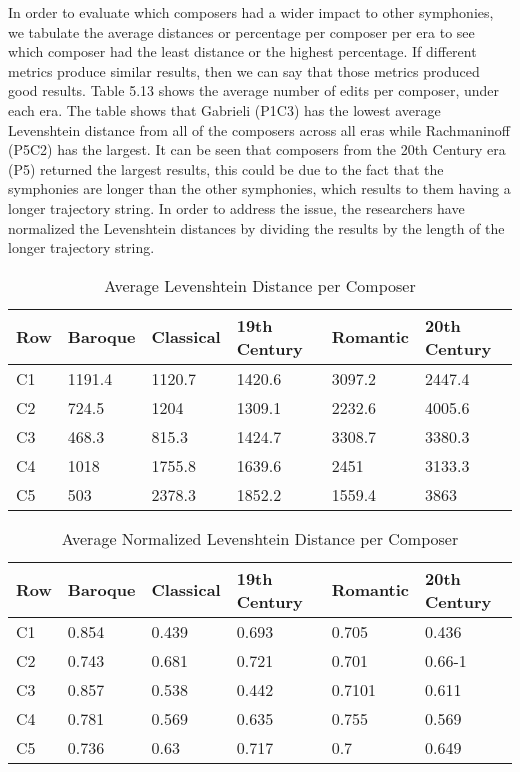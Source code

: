 In order to evaluate which composers had a wider impact to other symphonies, we tabulate the average distances or percentage per composer per era to see which composer had the least distance or the highest percentage. If different metrics produce similar results, then we can say that those metrics produced good results. Table 5.13 shows the average number of edits per composer, under each era. The table shows that Gabrieli (P1C3) has the lowest average Levenshtein distance from all of the composers across all eras while Rachmaninoff (P5C2) has the largest. It can be seen that composers from the 20th Century era (P5) returned the largest results, this could be due to the fact that the symphonies are longer than the other symphonies, which results to them having a longer trajectory string. In order to address the issue, the researchers have normalized the Levenshtein distances by dividing the results by the length of the longer trajectory string.

\begin{longtable}{|l|l|l|l|l|l|}
\caption{Average Levenshtein Distance per Composer}
\label{my-label}\\
\hline
Row & Baroque & Classical & 19th Century & Romantic & 20th Century \\ \hline
\endfirsthead
%
\endhead
%
C1 & 1191.4 & 1120.7 & 1420.6 & 3097.2 & 2447.4 \\ \hline
C2 & 724.5 & 1204 & 1309.1 & 2232.6 & 4005.6 \\ \hline
C3 & 468.3 & 815.3 & 1424.7 & 3308.7 & 3380.3 \\ \hline
C4 & 1018 & 1755.8 & 1639.6 & 2451 & 3133.3 \\ \hline
C5 & 503 & 2378.3 & 1852.2 & 1559.4 & 3863 \\ \hline
\end{longtable}

\begin{longtable}{|l|l|l|l|l|l|}
\caption{Average Normalized Levenshtein Distance per Composer}
\label{my-label}\\
\hline
Row & Baroque & Classical & 19th Century & Romantic & 20th Century \\ \hline
\endfirsthead
%
\endhead
%
C1 & 0.854 & 0.439 & 0.693 & 0.705 & 0.436 \\ \hline
C2 & 0.743 & 0.681 & 0.721 & 0.701 & 0.66-1 \\ \hline
C3 & 0.857 & 0.538 & 0.442 & 0.7101 & 0.611 \\ \hline
C4 & 0.781 & 0.569 & 0.635 & 0.755 & 0.569 \\ \hline
C5 & 0.736 & 0.63 & 0.717 & 0.7 & 0.649 \\ \hline
\end{longtable}

